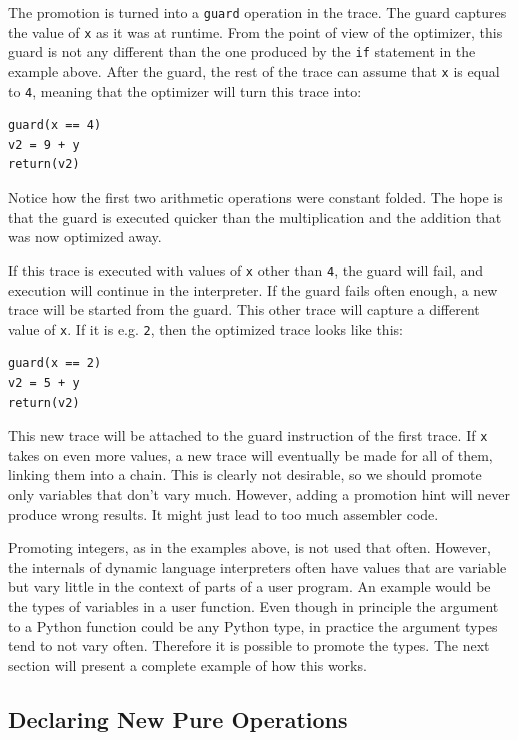 \documentclass{sig-alternate}
\begin{document}
The promotion is turned into a \texttt{guard} operation in the trace. The guard
captures the value of \texttt{x} as it was at runtime. From the point of view of the
optimizer, this guard is not any different than the one produced by the \texttt{if}
statement in the example above. After the guard, the rest of the trace can
assume that \texttt{x} is equal to \texttt{4}, meaning that the optimizer will turn this
trace into:

\begin{Verbatim}
guard(x == 4)
v2 = 9 + y
return(v2)
\end{Verbatim}

Notice how the first two arithmetic operations were constant folded. The hope is
that the guard is executed quicker than the multiplication and the addition that
was now optimized away.

If this trace is executed with values of \texttt{x} other than \texttt{4}, the guard will
fail, and execution will continue in the interpreter. If the guard fails often
enough, a new trace will be started from the guard. This other trace will
capture a different value of \texttt{x}. If it is e.g. \texttt{2}, then the optimized
trace looks like this:

\begin{Verbatim}
guard(x == 2)
v2 = 5 + y
return(v2)
\end{Verbatim}

This new trace will be attached to the guard instruction of the first trace. If
\texttt{x} takes on even more values, a new trace will eventually be made for all of them,
linking them into a chain. This is clearly not desirable, so we should promote
only variables that don't vary much. However, adding a promotion hint will never produce wrong
results. It might just lead to too much assembler code.

Promoting integers, as in the examples above, is not used that often.
However, the internals of dynamic language interpreters often
have values that are variable but vary little in the context of parts of a user
program. An example would be the types of variables in a user function. Even
though in principle the argument to a Python function could be any Python type,
in practice the argument types tend to not vary often. Therefore it is possible to
promote the types. The next section will present a complete example of how
this works.


\subsection{Declaring New Pure Operations}
\end{document}
